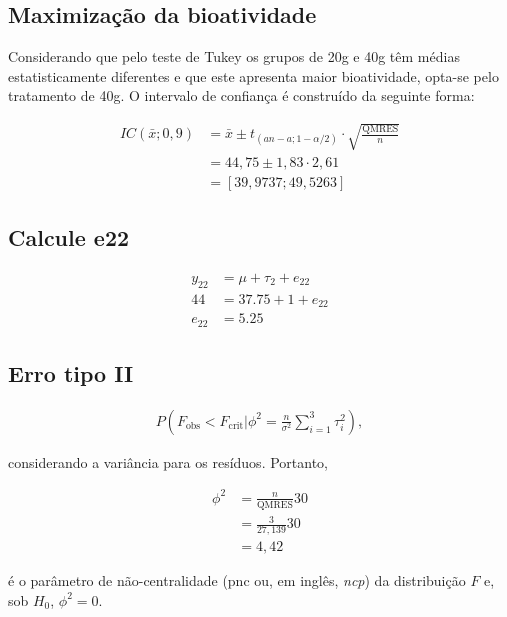 \documentclass[
]{article}
\begin{document}
\hypertarget{maximizauxe7uxe3o-da-bioatividade}{%
\subsection{Maximização da
bioatividade}\label{maximizauxe7uxe3o-da-bioatividade}}

Considerando que pelo teste de Tukey os grupos de 20g e 40g têm médias
estatisticamente diferentes e que este apresenta maior bioatividade,
opta-se pelo tratamento de 40g. O intervalo de confiança é construído da
seguinte forma:

\begin{align}
  IC(\bar{x}; 0,9) &= \bar{x} \pm t_{(an-a; 1-\alpha/2)} \cdot \sqrt{\frac{\text{QMRES}}{n}} \\
  &= 44,75 \pm 1,83 \cdot  2,61 \\
  &= \left[39,9737; 49,5263  \right]
\end{align}

\hypertarget{calcule-e22}{%
\subsection{Calcule e22}\label{calcule-e22}}

\begin{align}
  y_{22} &= \mu + \tau_2 + e_{22}\\
  44 &= 37.75 + 1 + e_{22} \\
  e_{22} &= 5.25
\end{align}

\hypertarget{erro-tipo-ii}{%
\subsection{Erro tipo II}\label{erro-tipo-ii}}

\begin{align}
  P\left( F_{\text{obs}} < F_\text{crit} \bigg| \phi^2 =  \frac{n}{\sigma^2} \sum\limits_{i=1}^{3} \tau_i^2  \right),
\end{align}

considerando a variância para os resíduos. Portanto,

\begin{align}
  \phi^2 &= \frac{n}{\text{QMRES}} 30 \\
  &= \frac{3}{27,139} 30 \\
  &= 4,42
\end{align}

é o parâmetro de não-centralidade (pnc ou, em inglês, \emph{ncp}) da
distribuição \(F\) e, sob \(H_0\), \(\phi^2 = 0\).
\end{document}
